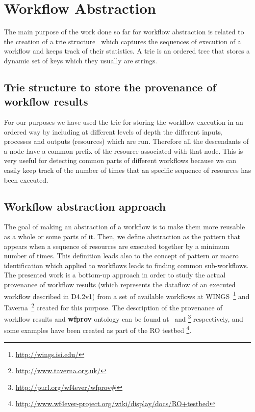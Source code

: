 \section{Workflow Abstraction}

\label{sec:abstraction}
The main purpose of the work done so far for workflow abstraction is related to the creation of a trie structure~\cite{knuth11} which captures the sequences of execution of a workflow and keeps track of their statistics. A trie is an ordered tree that stores a dynamic set of keys which they usually are strings. 

\subsection{Trie structure to store the provenance of workflow results}
For our purposes we have used the trie for storing the workflow execution in an ordered way by including at different levels of depth the different inputs, processes and outputs (resources) which are run. Therefore all the descendants of a node have a common prefix of the resource associated with that node. This is very useful for detecting common parts of different workflows because we can easily keep track of the number of times that an specific sequence of resources has been executed. \\

\subsection{Workflow abstraction approach}
The goal of making an abstraction of a workflow is to make them more reusable as a whole or some parts of it. Then, we define abstraction as the pattern that appears when a sequence of resources are executed together by a minimum number of times. This definition leads also to the concept of pattern or macro identification which applied to workflows leads to finding common sub-workflows. \\ 

The presented work is a bottom-up approach in order to study the actual provenance of workflow results (which represents the dataflow of an executed workflow described in D4.2v1) from a set of available workflows at WINGS~\footnote{\url{http://wings.isi.edu/}} and Taverna~\footnote{\url{http://www.taverna.org.uk/}} created for this purpose. The description of the provenance of workflow results and \textbf{wfprov} ontology can be found at~\cite{D4.2v1} and \footnote{\url{http://purl.org/wf4ever/wfprov#}} respectively, and some  examples have been created as part of the RO testbed \footnote{\url{http://www.wf4ever-project.org/wiki/display/docs/RO+testbed}}. \\

